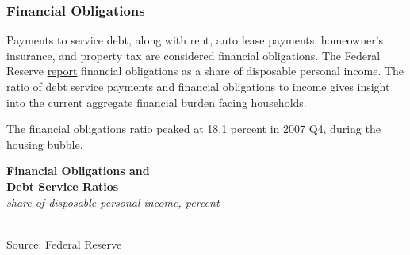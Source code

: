 \documentclass{report}
\makeatletter
\newcommand{\tbllink}[1]{\href{https://raw.githubusercontent.com/bdecon/US-chartbook/master/chartbook/data/#1}{\faTable}}
\newcommand*\short[1]{\expandafter\@gobbletwo\number\numexpr#1\relax}
\newcommand{\stdnode}[3]{\node[below, align=left, shift=({#1,#2})]{#3};}
\newcommand{\shdateaxisticks}{
		date coordinates in=x, axis line style={draw=none},
		xmax={2023-10-01},
		max space between ticks=40,	    
		xtick={{1990-01-01}, {1995-01-01}, {2000-01-01}, 
			{2005-01-01}, {2010-01-01}, {2015-01-01}, {2020-01-01}},
		minor xtick={},
		enlarge y limits={0.06}, enlarge x limits={0.01},
		}
\newcommand{\stdline}[4]{\addplot[very thick, no markers, color=#1] 
		table [x=#2, y=#3, col sep=comma] {#4};	}
\newcommand{\rbars}{
		\fill[color=black!10] (axis cs:{1990-07-01},\pgfkeysvalueof{/pgfplots/ymin}) rectangle 
			(axis cs:{1991-03-01}, \pgfkeysvalueof{/pgfplots/ymax});
		\fill[color=black!10] (axis cs:{2007-12-01},\pgfkeysvalueof{/pgfplots/ymin}) rectangle 
			(axis cs:{2009-07-01}, \pgfkeysvalueof{/pgfplots/ymax});
		\fill[color=black!10] (axis cs:{2001-03-01},\pgfkeysvalueof{/pgfplots/ymin}) rectangle 
			(axis cs:{2001-11-01}, \pgfkeysvalueof{/pgfplots/ymax});
		\fill[color=black!10] (axis cs:{2020-02-01},\pgfkeysvalueof{/pgfplots/ymin}) rectangle 
			(axis cs:{2020-05-01}, \pgfkeysvalueof{/pgfplots/ymax});}
\makeatother
\begin{document}
{\subsubsection*{Financial Obligations}  
\begin{minipage}{0.29\textwidth} 
\small Payments to service debt, along with rent, auto lease payments, homeowner's insurance, and property tax are considered financial obligations. The Federal Reserve \href{https://www.federalreserve.gov/releases/housedebt/default.htm}{report} financial obligations as a share of disposable personal income. The ratio of debt service payments and financial obligations to income gives insight into the current aggregate financial burden facing households. 

 The financial obligations ratio peaked at 18.1 percent in 2007 Q4, during the housing bubble.
\end{minipage}\hspace{8mm}
\begin{minipage}{0.415\textwidth}
\normalsize \textbf{Financial Obligations and}\\
\normalsize \textbf{Debt Service Ratios}\\
\footnotesize{\textit{share of disposable personal income, percent}}\\
\hspace*{-2mm} \\
\footnotesize{Source: Federal Reserve} \hfill \tbllink{for.csv} 
\end{minipage}
\newpage
\begin{minipage}{0.76\textwidth}  

\end{minipage}}
\end{document}

